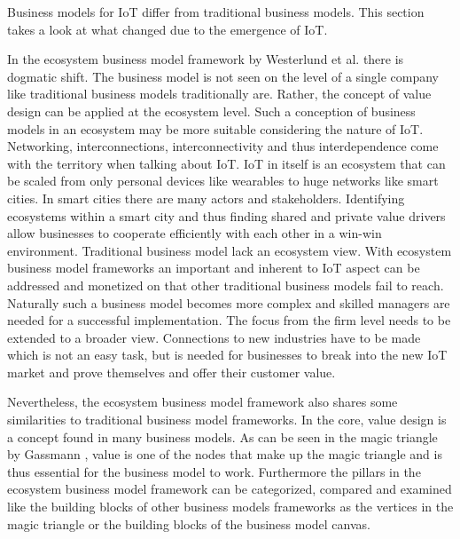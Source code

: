 	Business models for IoT differ from traditional business models. This section takes a look at what changed due to the emergence of IoT.

	In the ecosystem business model framework by Westerlund et al. \cite{westerlund} there is dogmatic shift. The business model is not seen on the level of a single company like traditional business models traditionally are. Rather, the concept of value design can be applied at the ecosystem level. Such a conception of business models in an ecosystem may be more suitable considering the nature of IoT. Networking, interconnections, interconnectivity and thus interdependence come with the territory when talking about IoT. IoT in itself is an ecosystem that can be scaled from only personal devices like wearables to huge networks like smart cities. In smart cities there are many actors and stakeholders. Identifying ecosystems within a smart city and thus finding shared and private value drivers allow businesses to cooperate efficiently with each other in a win-win environment. Traditional business model lack an ecosystem view. With ecosystem business model frameworks an important and inherent to IoT aspect can be addressed and monetized on that other traditional business models fail to reach. Naturally such a business model becomes more complex and skilled managers are needed for a successful implementation. The focus from the firm level needs to be extended to a broader view. Connections to new industries have to be made which is not an easy task, but is needed for businesses to break into the new IoT market and prove themselves and offer their customer value.

	Nevertheless, the ecosystem business model framework also shares some similarities to traditional business model frameworks. In the core, value design is a concept found in many business models. As can be seen in the magic triangle by Gassmann \cite{gassmann55}, value is one of the nodes that make up the magic triangle and is thus essential for the business model to work. Furthermore the pillars in the ecosystem business model framework can be categorized, compared and examined like the building blocks of other business models frameworks as the vertices in the magic triangle or the building blocks of the business model canvas.

